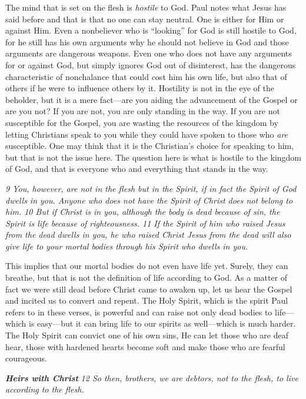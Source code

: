 The mind that is set on the flesh is \emph{hostile} to God. Paul notes
what Jesus has said before and that is that no one can stay neutral. One
is either for Him or against Him. Even a nonbeliever who is ``looking''
for God is still hostile to God, for he still has his own arguments why
he should not believe in God and those arguments are dangerous weapons.
Even one who does not have any arguments for or against God, but simply
ignores God out of disinterest, has the dangerous characteristic of
nonchalance that could cost him his own life, but also that of others if
he were to influence others by it. Hostility is not in the eye of the
beholder, but it is a mere fact---are you aiding the advancement of the
Gospel or are you not? If you are not, you are only standing in the way.
If you are not susceptible for the Gospel, you are wasting the resources
of the kingdom by letting Christians speak to you while they could have
spoken to those who \emph{are} susceptible. One may think that it is the
Christian's choice for speaking to him, but that is not the issue here.
The question here is what is hostile to the kingdom of God, and that is
everyone who and everything that stands in the way.

\emph{9 You, however, are not in the flesh but in the Spirit, if in fact
the Spirit of God dwells in you. Anyone who does not have the Spirit of
Christ does not belong to him. 10 But if Christ is in you, although the
body is dead because of sin, the Spirit is life because of
righteousness. 11 If the Spirit of him who raised Jesus from the dead
dwells in you, he who raised Christ Jesus from the dead will also give
life to your mortal bodies through his Spirit who dwells in you.}

This implies that our mortal bodies do not even have life yet. Surely,
they can breathe, but that is not the definition of life according to
God. As a matter of fact we were still dead before Christ came to awaken
up, let us hear the Gospel and incited us to convert and repent. The
Holy Spirit, which is the spirit Paul refers to in these verses, is
powerful and can raise not only dead bodies to life---which is
easy---but it can bring life to our spirits as well---which is much
harder. The Holy Spirit can convict one of his own sins, He can let
those who are deaf hear, those with hardened hearts become soft and make
those who are fearful courageous.

\textbf{\emph{Heirs with Christ}} \emph{12 So then, brothers, we are
debtors, not to the flesh, to live according to the flesh.}

